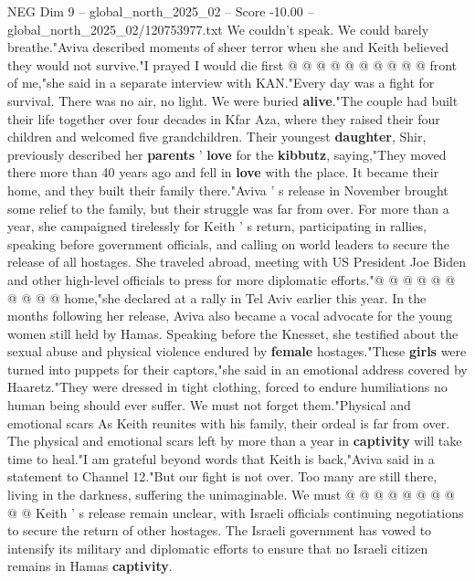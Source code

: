 \begin{textsample}{NEG Dim 9 – global\_north\_2025\_02 – Score -10.00 – global\_north\_2025\_02/120753977.txt}
We couldn't speak.
We could barely breathe."Aviva described moments of sheer terror when she and Keith believed they would not survive."I prayed I would die first @ @ @ @ @ @ @ @ @ @ front of me,"she said in a separate interview with KAN."Every day was a fight for survival.
There was no air, no light.
We were buried \textbf{alive}."The couple had built their life together over four decades in Kfar Aza, where they raised their four children and welcomed five grandchildren.
Their youngest \textbf{daughter}, Shir, previously described her \textbf{parents} ' \textbf{love} for the \textbf{kibbutz}, saying,"They moved there more than 40 years ago and fell in \textbf{love} with the place.
It became their home, and they built their family there."Aviva ' s release in November brought some relief to the family, but their struggle was far from over.
For more than a year, she campaigned tirelessly for Keith ' s return, participating in rallies, speaking before government officials, and calling on world leaders to secure the release of all hostages.
She traveled abroad, meeting with US President Joe Biden and other high-level officials to press for more diplomatic efforts."@ @ @ @ @ @ @ @ @ @ home,"she declared at a rally in Tel Aviv earlier this year.
In the months following her release, Aviva also became a vocal advocate for the young women still held by Hamas.
Speaking before the Knesset, she testified about the sexual abuse and physical violence endured by \textbf{female} hostages."These \textbf{girls} were turned into puppets for their captors,"she said in an emotional address covered by Haaretz."They were dressed in tight clothing, forced to endure humiliations no human being should ever suffer.
We must not forget them."Physical and emotional scars As Keith reunites with his family, their ordeal is far from over.
The physical and emotional scars left by more than a year in \textbf{captivity} will take time to heal."I am grateful beyond words that Keith is back,"Aviva said in a statement to Channel 12."But our fight is not over.
Too many are still there, living in the darkness, suffering the unimaginable.
We must @ @ @ @ @ @ @ @ @ @ Keith ' s release remain unclear, with Israeli officials continuing negotiations to secure the return of other hostages.
The Israeli government has vowed to intensify its military and diplomatic efforts to ensure that no Israeli citizen remains in Hamas \textbf{captivity}.

\end{textsample}
